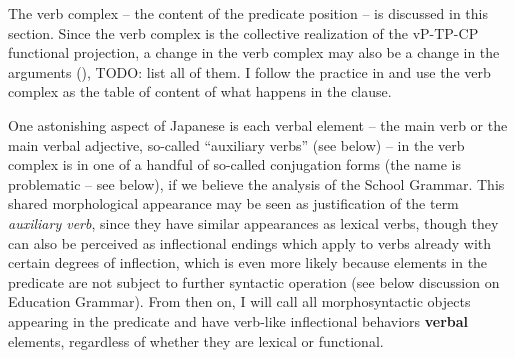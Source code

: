\documentclass[UTF8, a4paper, oneside, scheme=plain]{ctexart}
\newcommand*{\concept}[1]{\textbf{#1}}
\newcommand*{\term}[1]{\emph{#1}}
\begin{document}
The verb complex -- the content of the predicate position -- is discussed in this section.
Since the verb complex is the collective realization of the vP-TP-CP functional projection,
a change in the verb complex may also be a change in 
the arguments (),
TODO: list all of them.
I follow the practice in \citet{jacques2021grammar}
and use the verb complex as the table of content of what happens in the clause.

One astonishing aspect of Japanese is 
each verbal element -- the main verb or the main verbal adjective, so-called ``auxiliary verbs'' (see below) -- 
in the verb complex is in one of a handful of so-called conjugation forms (the name is problematic -- see below),
if we believe the analysis of the School Grammar.
This shared morphological appearance may be seen as justification of the term \term{auxiliary verb},
since they have similar appearances as lexical verbs,
though they can also be perceived as inflectional endings 
which apply to verbs already with certain degrees of inflection,
which is even more likely 
because elements in the predicate are not subject to further syntactic operation
(see below discussion on Education Grammar).
From then on, I will call all morphosyntactic objects 
appearing in the predicate and have verb-like inflectional behaviors \concept{verbal} elements,
regardless of whether they are lexical or functional.
\end{document}
